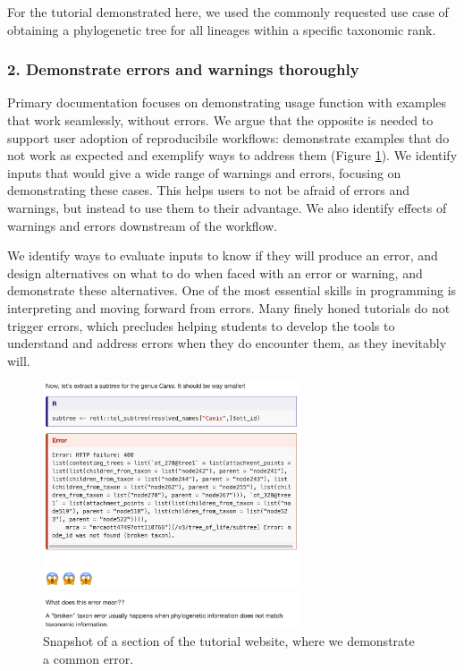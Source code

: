 \documentclass[12pt]{article}
\begin{document}
For the tutorial demonstrated here, we used the commonly requested use case of obtaining
a phylogenetic tree for all lineages within a specific taxonomic rank.

\subsubsection*{2. Demonstrate errors and warnings thoroughly}

Primary documentation focuses on demonstrating usage function with examples that
work seamlessly, without errors. We argue that the opposite is needed to support
user adoption of reproducibile workflows: demonstrate examples that do not work
as expected and exemplify ways to address them (Figure \ref{fig:first}). We identify inputs that would give
a wide range of warnings and errors, focusing on demonstrating these cases. This
helps users to not be afraid of errors and warnings, but instead to use them to
their advantage.
We also identify effects of warnings and errors downstream of the workflow.

We identify ways to evaluate inputs to know if they will produce an error, and design
alternatives on what to do when faced with an error or warning, and demonstrate
these alternatives.
One of the most essential skills in programming is interpreting and moving forward
from errors.
Many finely honed tutorials do not trigger errors, which precludes helping students
to develop the tools to understand and address errors when they do encounter them,
as they inevitably will.

\begin{figure}
\begin{center}
\includegraphics[width=3in]{fig1.png}
\end{center}
\caption{Snapshot of a section of the tutorial website, where we demonstrate a common error. \label{fig:first}}
\end{figure}
\end{document}
